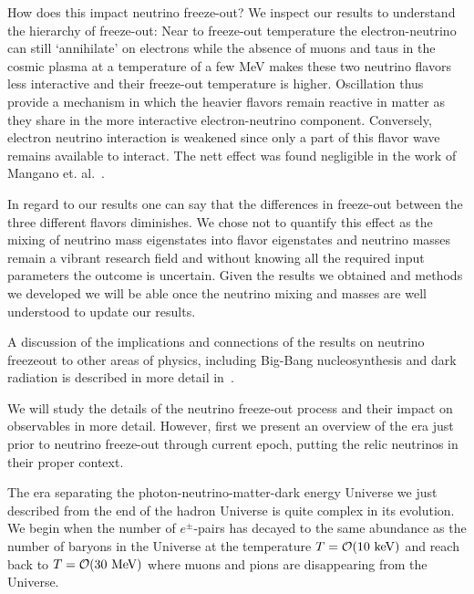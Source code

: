 How does this impact neutrino freeze-out? We inspect our results to understand the hierarchy of freeze-out: Near to freeze-out temperature the electron-neutrino can still `annihilate' on electrons while the absence of muons and taus in the cosmic plasma at a temperature of a few MeV makes these two neutrino flavors less interactive and their freeze-out temperature is higher. Oscillation thus provide a mechanism in which the heavier flavors remain reactive in matter as they share in the more interactive electron-neutrino component. Conversely, electron neutrino interaction is weakened since only a part of this flavor wave remains available to interact. The nett effect was found negligible in the work of Mangano et. al.~\cite{Mangano:2005cc}. 

In regard to our results one can say that  the differences in freeze-out between the three different flavors diminishes. We chose not to quantify this effect as the mixing of neutrino mass eigenstates into flavor eigenstates and neutrino masses remain a vibrant research field and without knowing  all the required input parameters the outcome is uncertain. Given the results we obtained and methods we developed we will be able once the neutrino mixing and masses are well understood to update our results. 

A discussion of the implications and connections of the results on neutrino freezeout to other areas of physics, including Big-Bang nucleosynthesis and dark radiation is described in more detail in~\cite{Dreiner:2011fp,Boehm:2012gr,Blennow:2012de,Birrell:2014uka}.  


We will study the details of the neutrino freeze-out process and their impact on observables in more detail. However, first we present an overview of the era just prior to neutrino freeze-out through current epoch, putting the relic neutrinos in their proper context.




The era separating the photon-neutrino-matter-dark energy Universe we just described from the end of the hadron Universe is quite complex in its evolution. We begin when the number of $e^\pm$-pairs has decayed to the same abundance as the number of baryons in the Universe at the temperature $T=\mathcal{O}(10\text{ keV})$ and reach back to $T={\cal O}(30\MeV)$ where muons and pions are disappearing from the Universe.

